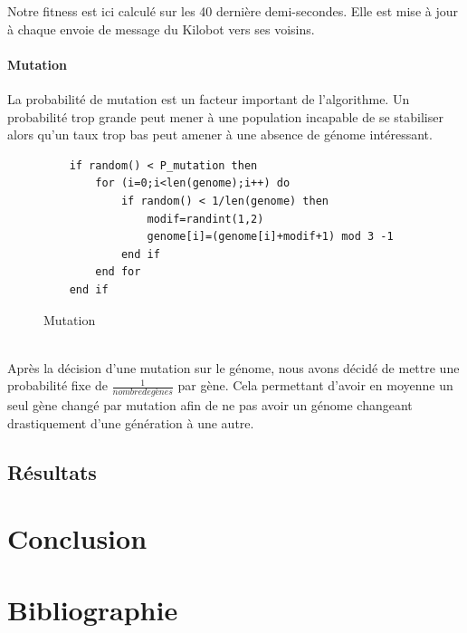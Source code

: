 \documentclass[a4paper]{article}
\begin{document}
Notre fitness est ici calculé sur les 40 dernière demi-secondes. Elle est mise à jour à chaque envoie de message du Kilobot vers ses voisins.
\paragraph{Mutation}  La probabilité de mutation est un facteur important de l'algorithme. Un probabilité trop grande peut mener à une population incapable de se stabiliser alors qu'un taux trop bas peut amener à une absence de génome intéressant.
\begin{figure}[h!]
	\centering
	\begin{lstlisting}
	if random() < P_mutation then
		for (i=0;i<len(genome);i++) do
			if random() < 1/len(genome) then
				modif=randint(1,2)
				genome[i]=(genome[i]+modif+1) mod 3 -1
			end if
		end for
	end if
	\end{lstlisting}
	\caption{Mutation}
\end{figure}
\\ Après la décision d'une mutation sur le génome, nous avons décidé de mettre une probabilité fixe de $\frac{1}{nombre de gènes}$ par gène. Cela permettant d'avoir en moyenne un seul gène changé par mutation afin de ne pas avoir un génome changeant drastiquement d'une génération à une autre.



\subsection{Résultats}
\newpage
\section{Conclusion}
\section{Bibliographie}

\printbibliography
\end{document}
